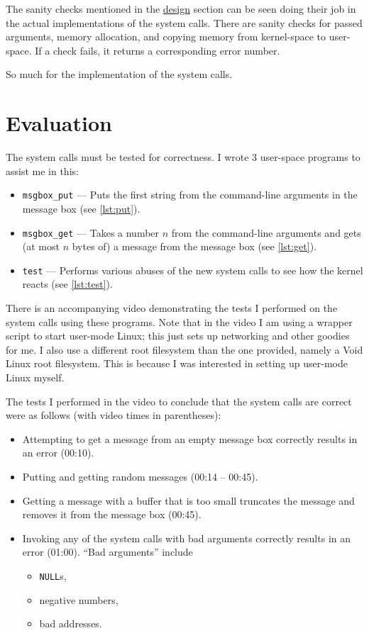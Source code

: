 \documentclass{report}
\begin{document}
The sanity checks mentioned in the \hyperref[sec:design]{design} section can be seen doing their job in the actual implementations of the system calls. There are sanity checks for passed arguments, memory allocation, and copying memory from kernel-space to user-space. If a check fails, it returns a corresponding error number.

So much for the implementation of the system calls.

\section*{Evaluation}

The system calls must be tested for correctness. I wrote 3 user-space programs to assist me in this:

\begin{itemize}
	\item \texttt{msgbox\_put} --- Puts the first string from the command-line arguments in the message box (see \autoref{lst:put}).
	\item \texttt{msgbox\_get} --- Takes a number $n$ from the command-line arguments and gets (at most $n$ bytes of) a message from the message box (see \autoref{lst:get}).
	\item \texttt{test} --- Performs various abuses of the new system calls to see how the kernel reacts (see \autoref{lst:test}).
\end{itemize}

\noindent There is an accompanying video demonstrating the tests I performed on the system calls using these programs. Note that in the video I am using a wrapper script to start user-mode Linux; this just sets up networking and other goodies for me. I also use a different root filesystem than the one provided, namely a Void Linux root filesystem. This is because I was interested in setting up user-mode Linux myself.

The tests I performed in the video to conclude that the system calls are correct were as follows (with video times in parentheses):

\begin{itemize}
	\item Attempting to get a message from an empty message box correctly results in an error (00:10).
	\item Putting and getting random messages (00:14 -- 00:45).
	\item Getting a message with a buffer that is too small truncates the message and removes it from the message box (00:45).
	\item Invoking any of the system calls with bad arguments correctly results in an error (01:00). ``Bad arguments'' include
	      \begin{itemize}
		      \item \texttt{NULL}s,
		      \item negative numbers,
		      \item bad addresses.
	      \end{itemize}
\end{itemize}
\end{document}
